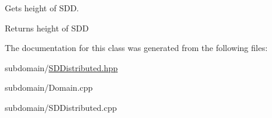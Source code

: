 Gets height of SDD. \begin{DoxyReturn}{Returns}
height of SDD 
\end{DoxyReturn}


The documentation for this class was generated from the following files:\begin{DoxyCompactItemize}
\item 
subdomain/\hyperlink{SDDistributed_8hpp}{SDDistributed.hpp}\item 
subdomain/Domain.cpp\item 
subdomain/SDDistributed.cpp\end{DoxyCompactItemize}
